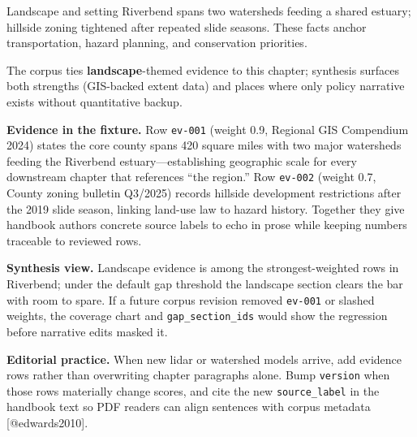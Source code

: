 \documentclass[
  ignorenonframetext,
]{beamer}
\author{\texorpdfstring{}{}}
\date{}
\begin{document}
\begin{frame}[fragile]{Landscape and setting}
\protect{}\label{landscape-and-setting}
Riverbend spans two watersheds feeding a shared estuary; hillside zoning
tightened after repeated slide seasons. These facts anchor
transportation, hazard planning, and conservation priorities.

The corpus ties \textbf{landscape}-themed evidence to this chapter;
synthesis surfaces both strengths (GIS-backed extent data) and places
where only policy narrative exists without quantitative backup.

\textbf{Evidence in the fixture.} Row \texttt{ev-001} (weight 0.9,
Regional GIS Compendium 2024) states the core county spans 420 square
miles with two major watersheds feeding the Riverbend
estuary---establishing geographic scale for every downstream chapter
that references ``the region.'' Row \texttt{ev-002} (weight 0.7, County
zoning bulletin Q3/2025) records hillside development restrictions after
the 2019 slide season, linking land-use law to hazard history. Together
they give handbook authors concrete source labels to echo in prose while
keeping numbers traceable to reviewed rows.

\textbf{Synthesis view.} Landscape evidence is among the
strongest-weighted rows in Riverbend; under the default gap threshold
the landscape section clears the bar with room to spare. If a future
corpus revision removed \texttt{ev-001} or slashed weights, the coverage
chart and \texttt{gap\_section\_ids} would show the regression before
narrative edits masked it.

\textbf{Editorial practice.} When new lidar or watershed models arrive,
add evidence rows rather than overwriting chapter paragraphs alone. Bump
\texttt{version} when those rows materially change scores, and cite the
new \texttt{source\_label} in the handbook text so PDF readers can align
sentences with corpus metadata {[}@edwards2010{]}.
\end{frame}
\end{document}

